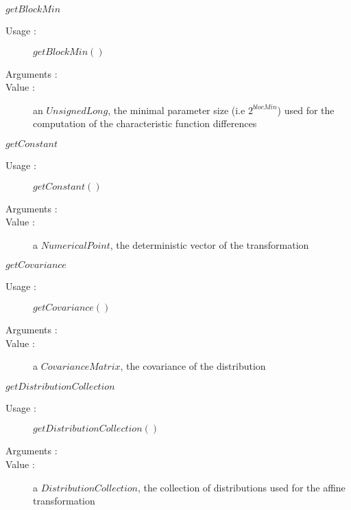 \begin{description}
\begin{description}
  \item $getBlockMin$
    \begin{description}
    \item[Usage :]  $getBlockMin()$
    \item[Arguments :]  \strut
    \item[Value :] an $UnsignedLong$, the minimal parameter size (i.e $2^{blocMin}$) used for the computation of the characteristic function differences
    \end{description}

  \item $getConstant$
    \begin{description}
    \item[Usage :]  $getConstant()$
    \item[Arguments :]  \strut
    \item[Value :] a $NumericalPoint$, the deterministic vector of the transformation
    \end{description}

  \item $getCovariance$
    \begin{description}
    \item[Usage :]  $getCovariance()$
    \item[Arguments :]  \strut
    \item[Value :] a $CovarianceMatrix$, the covariance of the distribution
    \end{description}

  \item $getDistributionCollection$
    \begin{description}
    \item[Usage :]  $getDistributionCollection()$
    \item[Arguments :]  \strut
    \item[Value :] a $DistributionCollection$, the collection of distributions used for the affine transformation
    \end{description}


\end{description}
\end{description}
